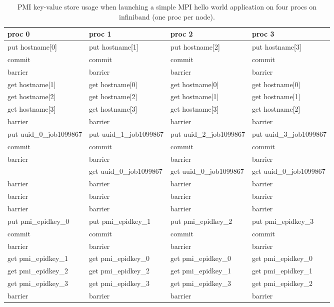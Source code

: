 \begin{table}
\centering
\begin{tabular}{|p{4cm}|p{4cm}|p{4cm}|p{4cm}|}\hline
\textbf{proc 0} &       \textbf{proc 1} &   \textbf{proc 2} &    \textbf{proc 3}\\
\hline
put hostname[0] &     put hostname[1] &     put hostname[2] &     put hostname[3]\\
commit &              commit &              commit  &             commit\\
barrier &             barrier &             barrier &             barrier\\
\hline
get hostname[1] &     get hostname[0] &     get hostname[0] &     get hostname[0]\\
get hostname[2] &     get hostname[2] &     get hostname[1] &     get hostname[1]\\
get hostname[3] &     get hostname[3] &     get hostname[3] &     get hostname[2]\\
barrier& barrier & barrier & barrier\\
\hline
put uuid\_0\_job1099867
  & put uuid\_1\_job1099867
  & put uuid\_2\_job1099867
  & put uuid\_3\_job1099867 \\
commit &              commit &              commit &              commit\\
barrier &             barrier &             barrier &             barrier\\
\hline
  & get uuid\_0\_job1099867
  & get uuid\_0\_job1099867
  & get uuid\_0\_job1099867 \\
barrier &             barrier &             barrier &             barrier\\
barrier &             barrier &             barrier &             barrier\\
barrier &             barrier &             barrier &             barrier\\
\hline
put pmi\_epidkey\_0
  & put pmi\_epidkey\_1
  & put pmi\_epidkey\_2
  & put pmi\_epidkey\_3\\
commit &              commit &              commit &              commit\\
barrier &             barrier &             barrier &             barrier\\
\hline
get pmi\_epidkey\_1
  & get pmi\_epidkey\_0
  & get pmi\_epidkey\_0
  & get pmi\_epidkey\_0\\
get pmi\_epidkey\_2
  & get pmi\_epidkey\_2
  & get pmi\_epidkey\_1
  & get pmi\_epidkey\_1\\
get pmi\_epidkey\_3
  & get pmi\_epidkey\_3
  & get pmi\_epidkey\_3
  & get pmi\_epidkey\_2\\
barrier &             barrier &             barrier &             barrier\\
\hline
\end{tabular}
\caption{ PMI key-value store usage when launching a simple 
MPI hello world application on four procs on infiniband (one proc per node).}
\label{tab:mvapichpsm}
\end{table}


